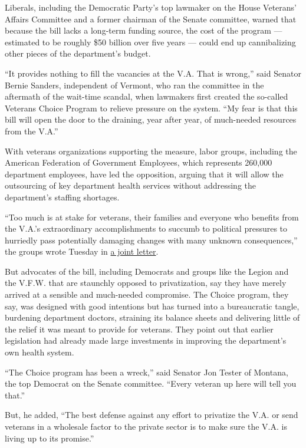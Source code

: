 Liberals, including the Democratic Party's top lawmaker on the House
Veterans' Affairs Committee and a former chairman of the Senate
committee, warned that because the bill lacks a long-term funding
source, the cost of the program --- estimated to be roughly \$50 billion
over five years --- could end up cannibalizing other pieces of the
department's budget.

``It provides nothing to fill the vacancies at the V.A. That is wrong,''
said Senator Bernie Sanders, independent of Vermont, who ran the
committee in the aftermath of the wait-time scandal, when lawmakers
first created the so-called Veterans Choice Program to relieve pressure
on the system. ``My fear is that this bill will open the door to the
draining, year after year, of much-needed resources from the V.A.''

With veterans organizations supporting the measure, labor groups,
including the American Federation of Government Employees, which
represents 260,000 department employees, have led the opposition,
arguing that it will allow the outsourcing of key department health
services without addressing the department's staffing shortages.

``Too much is at stake for veterans, their families and everyone who
benefits from the V.A.'s extraordinary accomplishments to succumb to
political pressures to hurriedly pass potentially damaging changes with
many unknown consequences,'' the groups wrote Tuesday in
\href{https://www.afge.org/globalassets/documents/generalreports/2018/5-22-18-joint-letter-to-senate-opposing-s-2372-the-va-mission-act.pdf}{a
joint letter}.

But advocates of the bill, including Democrats and groups like the
Legion and the V.F.W. that are staunchly opposed to privatization, say
they have merely arrived at a sensible and much-needed compromise. The
Choice program, they say, was designed with good intentions but has
turned into a bureaucratic tangle, burdening department doctors,
straining its balance sheets and delivering little of the relief it was
meant to provide for veterans. They point out that earlier legislation
had already made large investments in improving the department's own
health system.

``The Choice program has been a wreck,'' said Senator Jon Tester of
Montana, the top Democrat on the Senate committee. ``Every veteran up
here will tell you that.''

But, he added, ``The best defense against any effort to privatize the
V.A. or send veterans in a wholesale factor to the private sector is to
make sure the V.A. is living up to its promise.''

